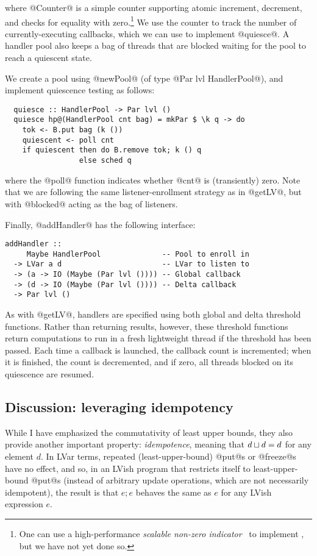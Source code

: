 where @Counter@ is a simple counter supporting atomic increment,
decrement, and checks for equality with zero.\footnote{One can use a
  high-performance \emph{scalable non-zero indicator}~\cite{snzi} to
  implement , but we have not yet done so.}  We use the
counter to track the number of currently-executing callbacks, which we
can use to implement @quiesce@.  A handler pool also keeps a bag of
threads that are blocked waiting for the pool to reach a quiescent
state.

We create a pool using @newPool@ (of type @Par lvl HandlerPool@), and
implement quiescence testing as follows:

\begin{lstlisting}
  quiesce :: HandlerPool -> Par lvl ()
  quiesce hp@(HandlerPool cnt bag) = mkPar $ \k q -> do
    tok <- B.put bag (k ())
    quiescent <- poll cnt
    if quiescent then do B.remove tok; k () q
                 else sched q
\end{lstlisting}

where the @poll@ function indicates whether @cnt@ is (transiently)
zero.  Note that we are following the same listener-enrollment
strategy as in @getLV@, but with @blocked@ acting as the bag of
listeners.

Finally, @addHandler@ has the following interface:

\begin{lstlisting}
addHandler :: 
     Maybe HandlerPool              -- Pool to enroll in
  -> LVar a d                       -- LVar to listen to
  -> (a -> IO (Maybe (Par lvl ()))) -- Global callback
  -> (d -> IO (Maybe (Par lvl ()))) -- Delta callback
  -> Par lvl ()
\end{lstlisting}

As with @getLV@, handlers are specified using both global and delta
threshold functions.  Rather than returning results, however, these
threshold functions return computations to run in a fresh lightweight
thread if the threshold has been passed.  Each time a callback is
launched, the callback count is incremented; when it is finished, the
count is decremented, and if zero, all threads blocked on its
quiescence are resumed.

\subsection{Discussion: leveraging idempotency}\label{subsection:lvish-discussion-leveraging-idempotency}

While I have emphasized the commutativity of least upper bounds, they
also provide another important property: \emph{idempotence}, meaning
that $d \sqcup d = d$ for any element $d$.  In LVar terms,
repeated (least-upper-bound) @put@s or @freeze@s have no effect, and
so, in an LVish program that restricts itself to least-upper-bound
@put@s (instead of arbitrary update operations, which are not
necessarily idempotent), the result is that $e; e$ behaves the same as
$e$ for any LVish expression $e$.


